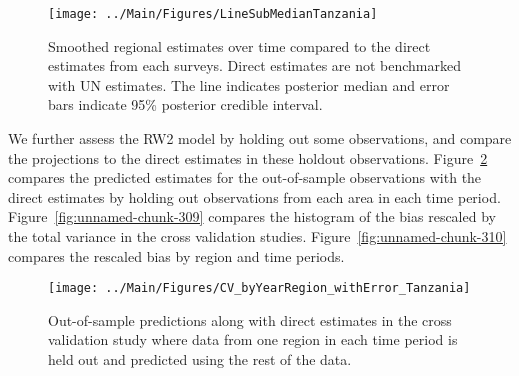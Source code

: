 \documentclass[12pt]{article}\usepackage[]{graphicx}\usepackage[]{color}
\newenvironment{knitrout}{}{} %
\begin{document}
\begin{knitrout}
\color{fgcolor}\begin{figure}[bht]

{\centering \texttt{[image: ../Main/Figures/LineSubMedianTanzania]} 

}

\caption[Smoothed regional estimates over time compared to the direct estimates from each surveys]{Smoothed regional estimates over time compared to the direct estimates from each surveys. Direct estimates are not benchmarked with UN estimates. The line indicates posterior median and error bars indicate 95\% posterior credible interval.}\label{fig:unnamed-chunk-307}
\end{figure}


\end{knitrout}
We further assess the RW2 model by holding out some observations, and compare the projections to the direct estimates in these holdout observations. Figure~\ref{fig:unnamed-chunk-308} compares the predicted estimates for the out-of-sample observations  with the direct estimates by holding out observations from each area in each time period.  Figure~\ref{fig:unnamed-chunk-309} compares the histogram of the bias rescaled by the total variance in the cross validation studies. Figure~\ref{fig:unnamed-chunk-310} compares the rescaled bias by region and time periods.



 
\begin{knitrout}
\color{fgcolor}\begin{figure}[bht]

{\centering \texttt{[image: ../Main/Figures/CV\_byYearRegion\_withError\_Tanzania]} 

}

\caption[Out-of-sample predictions along with direct estimates in the cross validation study where data from one region in each time period is held out and predicted using the rest of the data]{Out-of-sample predictions along with direct estimates in the cross validation study where data from one region in each time period is held out and predicted using the rest of the data.}\label{fig:unnamed-chunk-308}
\end{figure}


\end{knitrout}
\end{document}
